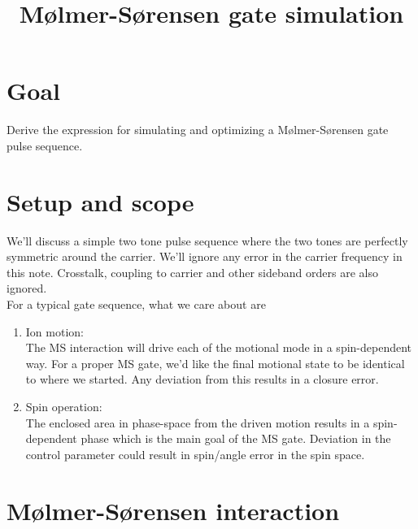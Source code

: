 \documentclass[10pt,fleqn]{article}
\title{M{\o}lmer-S{\o}rensen gate simulation}
\begin{document}
\maketitle

\section{Goal}
Derive the expression for simulating and optimizing a M{\o}lmer-S{\o}rensen gate
pulse sequence.

\section{Setup and scope}
We'll discuss a simple two tone pulse sequence where the two tones
are perfectly symmetric around the carrier.
We'll ignore any error in the carrier frequency in this note.
Crosstalk, coupling to carrier and other sideband orders are also ignored.\\

For a typical gate sequence, what we care about are
\begin{enumerate}
\item Ion motion:\\
  The MS interaction will drive each of the motional mode in a spin-dependent way.
  For a proper MS gate, we'd like the final motional state to be identical
  to where we started. Any deviation from this results in a closure error.
\item Spin operation:\\
  The enclosed area in phase-space from the driven motion results in
  a spin-dependent phase which is the main goal of the MS gate.
  Deviation in the control parameter could result in spin/angle error
  in the spin space.
\end{enumerate}

\section{M{\o}lmer-S{\o}rensen interaction}
\end{document}

